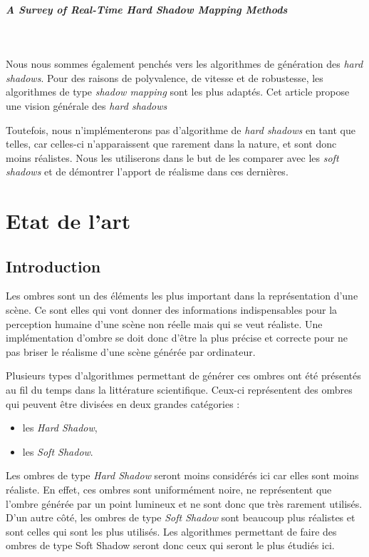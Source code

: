 \documentclass[a4paper,10pt]{report}
\begin{document}
\paragraph{\large A Survey of Real-Time Hard Shadow Mapping Methods}
~~\\
\cite{scherzer2011survey}

Nous nous sommes également penchés vers les algorithmes de génération des \textit{hard shadows}. Pour des raisons de polyvalence, de vitesse et de robustesse, les algorithmes de type \textit{shadow mapping} sont les plus adaptés. Cet article propose une vision générale des \textit{hard shadows}

Toutefois, nous n'implémenterons pas d'algorithme de \textit{hard shadows} en tant que telles, car celles-ci n'apparaissent que rarement dans la nature, et sont donc moins réalistes. Nous les utiliserons dans le but de les comparer avec les \textit{soft shadows} et de démontrer l'apport de réalisme dans ces dernières.

\chapter{Etat de l'art}

\section{Introduction}

Les ombres sont un des éléments les plus important dans la représentation d'une scène. Ce sont elles qui vont donner des informations indispensables pour la perception humaine d'une scène non réelle mais qui se veut réaliste. Une implémentation d'ombre se doit donc d'être la plus précise et correcte pour ne pas briser le réalisme d'une scène générée par ordinateur.

Plusieurs types d'algorithmes permettant de générer ces ombres ont été présentés au fil du temps dans la littérature scientifique. Ceux-ci représentent des ombres qui peuvent être divisées en deux grandes catégories : 
\begin{itemize}
\item les \textit{Hard Shadow},
\item les \textit{Soft Shadow}.
\end{itemize}
Les ombres de type \textit{Hard Shadow} seront moins considérés ici car elles sont moins réaliste. En effet, ces ombres sont uniformément noire, ne représentent que l'ombre générée par un point lumineux et ne sont donc que très rarement utilisés. D'un autre côté, les ombres de type \textit{Soft Shadow} sont beaucoup plus réalistes et sont celles qui sont les plus utilisés. Les algorithmes permettant de faire des ombres de type Soft Shadow seront donc ceux qui seront le plus étudiés ici.
\end{document}
